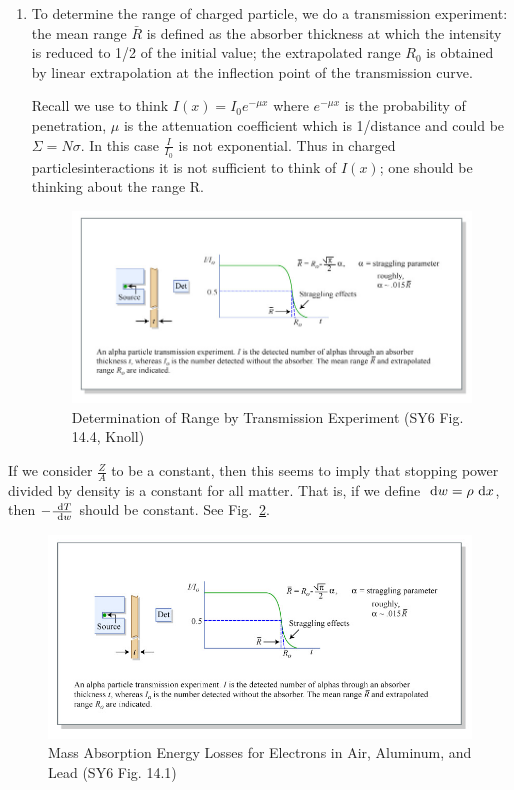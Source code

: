 \documentclass{school-22.101-notes}
\begin{document}
\begin{enumerate}
\item To determine the range of charged particle, we do a transmission experiment: the mean range $\bar{R}$ is defined as the absorber thickness at which the intensity is reduced to 1/2 of the initial value; the extrapolated range $R_0$ is obtained by linear extrapolation at the inflection point of the transmission curve. 

Recall we use to think $\displaystyle I(x) = I_0 e^{-\mu x}$ where $e^{-\mu x}$ is the probability of penetration, $\mu$ is the attenuation coefficient which is 1/distance and could be $\Sigma = N \sigma$. In this case $\frac{I}{I_0}$ is not exponential. Thus in charged particlesinteractions it is not sufficient to think of $I(x)$; one should be thinking about the range R. 
\begin{figure}[ht]
  \centering
  \includegraphics[width=5in]{images/ni/14.4.png}
  \caption{Determination of Range by Transmission Experiment (SY6 Fig. 14.4, Knoll)} \label{14.4}
\end{figure}
\end{enumerate}



If we consider $\frac{Z}{A}$ to be a constant, then this seems to imply that stopping power divided by density is a constant for all matter. That is, if we define $\mbox{ }\mathrm{d} w = \rho \mbox{ }\mathrm{d} x$, then $-\frac{\mbox{ }\mathrm{d} T}{\mbox{ }\mathrm{d} w}$ should be constant. See Fig.~\ref{14.1}. 
\begin{figure}[ht]
  \centering
  \includegraphics[width=5in]{images/ni/14.4.png}
  \caption{Mass Absorption Energy Losses for Electrons in Air, Aluminum, and Lead (SY6 Fig. 14.1)} \label{14.1}
\end{figure}
\end{document}
